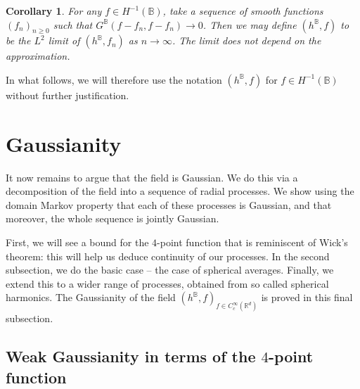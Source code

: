 \documentclass[JEP,XML,SOM,Unicode,published]{cedram}
\newtheorem{cor}[theorem]{Corollary}
\theoremstyle{definition}
\newcommand{\R}{\mathbb{R}}
\newcommand{\B}{\mathbb{B}}\let\D\B\let\Ub\B
\begin{document}
\begin{cor}\label{cor}
For any $f\in H^{-1}(\B)$, take a sequence of smooth functions $(f_n)_{n\ge 0}$ such that $G^\B(f-f_n,f-f_n)\to 0$. Then we may define $(h^\B,f)$ to be the $L^2$ limit of $(h^\B,f_n)$ as $n\to \infty$. The limit does not depend on the approximation.
\end{cor}

In what follows, we will therefore use the notation $(h^\B, f)$ for $f\in H^{-1}(\B)$ without further justification.\enlargethispage{.5\baselineskip}%

\section{Gaussianity}\label{sec:gauss}

It now remains to argue that the field is Gaussian. We do this via a decomposition of the field into a sequence of radial processes. We show using the domain Markov property that each of these processes is Gaussian, and that moreover, the whole sequence is jointly Gaussian.

First, we will see a bound for the $4$-point function that is reminiscent of Wick's theorem: this will help us deduce continuity of our processes. In the second subsection, we do the basic case -- the case of spherical averages. Finally, we extend this to a wider range of processes, obtained from so called spherical harmonics. The Gaussianity of the field $(h^\B, f)_{f \in C_c^\infty(\R^d)}$ is proved in this final subsection.

\subsection{Weak Gaussianity in terms of the $4$-point function}
\end{document}

